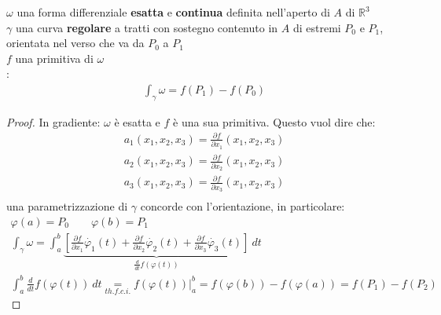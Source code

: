 \documentclass[a4paper, oneside]{article}
\begin{document}
\begin{theorem}
     $\omega$ una forma differenziale \textbf{esatta} e \textbf{continua} definita nell'aperto di $A$ di $\mathbb{R}^3$\\
     $\gamma$ una curva \textbf{regolare} a tratti con sostegno contenuto in $A$ di estremi $P_0$ e $P_1$, orientata nel verso che va da $P_0$ a $P_1$\\
     $f$ una primitiva di $\omega$\\
    :
    \begin{gather*}
        \int_{\gamma} \omega = f(P_1) - f(P_0) 
    \end{gather*}
\end{theorem}
    \begin{center}
    \end{center}
    \begin{proof}
        In gradiente: $\omega$ è esatta e $f$ è una sua primitiva. Questo vuol dire che:
        \begin{gather*}
            a_1(x_1,x_2,x_3) = \frac{\partial f}{\partial x_1}(x_1,x_2,x_3)\\
            a_2(x_1,x_2,x_3) = \frac{\partial f}{\partial x_2}(x_1,x_2,x_3)\\
            a_3(x_1,x_2,x_3) = \frac{\partial f}{\partial x_3}(x_1,x_2,x_3)\\
        \end{gather*}
         una parametrizzazione di $\gamma$ concorde con l'orientazione, in particolare:
        \begin{gather*}
            \varphi(a) = P_0 \qquad \varphi(b) = P_1\\
            \int_{\gamma} \omega = \int_{a}^{b} \underbrace{\left[ \frac{\partial f}{\partial x_1}\dot{\varphi_1}(t) + \frac{\partial f}{\partial x_2}\dot{\varphi_2}(t) + \frac{\partial f}{\partial x_3}\dot{\varphi_3}(t)\right]}_{\frac{d}{dt} f(\varphi(t))}  \ dt\\
            \int_{a}^{b} \frac{d}{dt} f(\varphi(t)) \ dt \underset{th.f.c.i.}{=} f(\varphi(t)) |_a^b = f(\varphi(b)) - f(\varphi(a)) = f(P_1) - f(P_2)
        \end{gather*}
    \end{proof}
\end{document}
